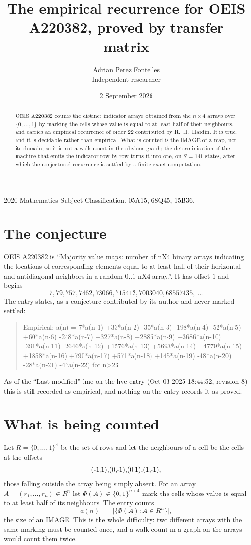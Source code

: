 \documentclass[11pt,a4paper]{article}
\title{The empirical recurrence for OEIS A220382, proved by transfer matrix}
\author{Adrian Perez Fontelles\\ \small Independent researcher}
\date{2 September 2026}
\theoremstyle{plain}
\theoremstyle{definition}
\begin{document}
\maketitle

\begin{abstract}
OEIS A220382 counts the distinct indicator arrays obtained from the $n\times4$ arrays over
$\{0,\dots,1\}$ by marking the cells whose value is equal to at least half of their neighbours, and carries an
empirical recurrence of order $22$ contributed by R.~H.~Hardin. It is true, and it is
decidable rather than empirical. What is counted is the IMAGE of a map, not its domain, so it
is not a walk count in the obvious graph; the determinisation of the machine that emits the
indicator row by row turns it into one, on $S=141$ states, after which the conjectured
recurrence is settled by a finite exact computation.
\end{abstract}

\noindent\small 2020 Mathematics Subject Classification. 05A15, 68Q45, 15B36.\normalsize

\section{The conjecture}

OEIS A220382 is ``Majority value maps: number of nX4 binary arrays indicating the locations of corresponding elements equal to at least half of their horizontal and antidiagonal neighbors in a random 0..1 nX4 array.''. It has offset $1$ and begins
\[
7, 79, 757, 7462, 73066, 715412, 7003040, 68557435,\ \dots
\]
The entry states, as a conjecture contributed by its author and never marked settled:
\begin{quote}
Empirical: a(n) = 7*a(n-1) +33*a(n-2) -35*a(n-3) -198*a(n-4) -52*a(n-5) +60*a(n-6) -248*a(n-7) +327*a(n-8) +2885*a(n-9) +3686*a(n-10) -391*a(n-11) -2646*a(n-12) +1576*a(n-13) +5693*a(n-14) +4779*a(n-15) +1858*a(n-16) +790*a(n-17) +571*a(n-18) +145*a(n-19) -48*a(n-20) -28*a(n-21) -4*a(n-22) for n>23
\end{quote}
As of the ``Last modified'' line on the live entry (Oct 03 2025 18:44:52, revision 8) this is still
recorded as empirical, and nothing on the entry records it as proved.

\section{What is being counted}

Let $R=\{0,\dots,1\}^{4}$ be the set of rows and let the neighbours of a cell be the
cells at the offsets
\[
$(-1,1)$, $(0,-1)$, $(0,1)$, $(1,-1)$,
\]
those falling outside the array being simply absent. For an array
$A=(r_1,\dots,r_n)\in R^n$ let $\Phi(A)\in\{0,1\}^{n\times4}$ mark the cells whose value
is equal to at least half of its neighbours. The entry counts
\[
a(n)\;=\;\bigl|\{\Phi(A):A\in R^n\}\bigr| ,
\]
the size of an IMAGE. This is the whole difficulty: two different arrays with the same marking
must be counted once, and a walk count in a graph on the arrays would count them twice.
\end{document}
